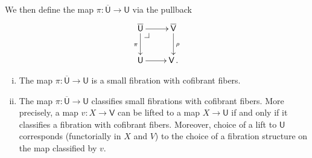 \documentclass[reqno,10pt,a4paper,oneside,draft]{amsart}
\makeatletter
\numberwithin{equation}{section}
\theoremstyle{mythm}
\theoremstyle{mydef}
\theoremstyle{myrmk}
\newcommand{\pullback}[1]{\save*!/#1-1.2pc/#1:(-1,1)@^{|-}\restore}
\newcommand{\drpullback}{\pullback{dr}}
\newcommand{\co}{\colon}
\newcommand{\UU}{\overline{\mathsf{U}}}
\newcommand{\U}{\mathsf{U}}
\newcommand{\VV}{\overline{\mathsf{V}}}
\newcommand{\V}{\mathsf{V}}
\makeatother
\begin{document}
We then define the map $\pi \co \UU \to \U$ via the pullback 
\begin{equation}
\label{equ:def-of-pi}
\begin{gathered}
\xymatrix{
\UU \ar[r] \ar[d]_\pi \drpullback  & \VV \ar[d]^\rho \\
\U \ar[r] & \V \, . }
\end{gathered}
\end{equation}



\begin{proposition} \label{thm:universe-u}  \hfill 
\begin{enumerate}[(i)] 
\item The map $\pi \co \UU \to \U$ is a small fibration with cofibrant fibers.
\item The map $\pi \co \UU \to \U$ classifies small fibrations with cofibrant fibers. More precisely, a map $v \co X \to \V$ can be lifted to a map $X \to \U$ if and only if it classifies a fibration with cofibrant fibers. Moreover, choice of a lift to $\U$ corresponds (functorially in $X$ and $V$) to the choice of a fibration structure on the map classified by $v$.

\end{enumerate}
\end{proposition}
\end{document}
